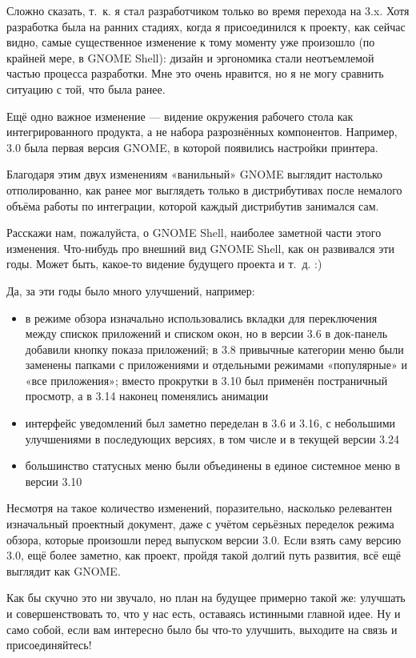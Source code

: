 \documentclass[10pt, a5paper]{article}
\begin{document}
\begin{Parallel}[p]{}{}
{\a Сложно сказать, т.~к. я стал разработчиком только во время перехода на 3.x. Хотя разработка была на ранних стадиях, когда я присоединился к проекту, как сейчас видно, самые существенное изменение к тому моменту уже произошло (по крайней мере, в GNOME Shell): дизайн и эргономика стали неотъемлемой частью процесса разработки. Мне это очень нравится, но я не могу сравнить ситуацию с той, что была ранее.

Ещё одно важное изменение — видение окружения рабочего стола как интегрированного продукта, а не набора разрознённых компонентов. Например, 3.0 была первая версия GNOME, в которой появились настройки принтера.

Благодаря этим двух изменениям «ванильный» GNOME выглядит настолько {\color{red} отполированно}, как ранее мог выглядеть только в дистрибутивах после немалого объёма работы по интеграции, которой каждый дистрибутив занимался сам.

\q Расскажи нам, пожалуйста, о GNOME Shell, наиболее заметной части этого изменения. Что-нибудь про внешний вид GNOME Shell, как он развивался эти годы. Может быть, какое-то видение будущего проекта и т.~д. :)

\a Да, за эти годы было много улучшений, например:
\begin{itemize}
\item в режиме обзора изначально использовались вкладки для переключения между спискок приложений и списком окон, но в версии 3.6 в док-панель добавили кнопку показа приложений; в 3.8 привычные категории меню были заменены папками с приложениями и отдельными режимами «популярные» и «все приложения»; вместо прокрутки в 3.10 был применён постраничный просмотр, а в 3.14 наконец поменялись анимации

\item интерфейс уведомлений был заметно переделан в 3.6 и 3.16, с небольшими улучшениями в последующих версиях, в том числе и в текущей версии 3.24

\item большинство статусных меню были объединены в единое системное меню в версии 3.10
\end{itemize}

Несмотря на такое количество изменений, поразительно, насколько релевантен изначальный проектный документ\fakefootnote{}, даже с учётом серьёзных переделок режима обзора, которые произошли перед выпуском версии 3.0. Если взять саму версию 3.0\fakefootnote{}, ещё более заметно, как проект, пройдя такой долгий путь развития, всё ещё выглядит как GNOME.

Как бы скучно это ни звучало, но план на будущее примерно такой же: улучшать и совершенствовать то, что у нас есть, оставаясь истинными главной идее. Ну и само собой, если вам интересно было бы что-то улучшить, выходите на связь и присоединяйтесь!

\vfill
     }
   \end{Parallel}
\end{document}
